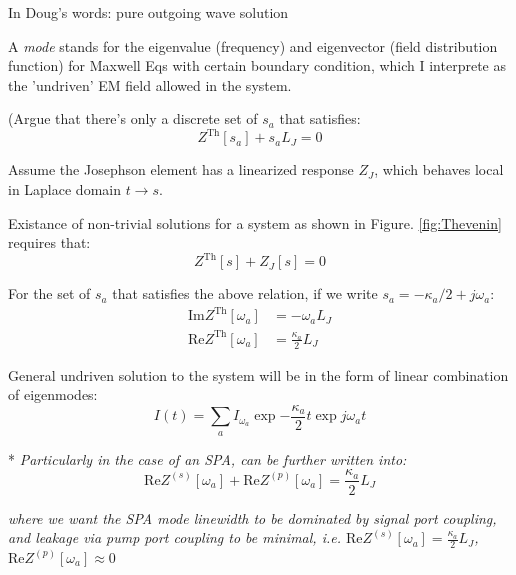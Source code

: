 \documentclass{article}
\renewcommand{\Re}{\mathrm{Re}}
\renewcommand{\Im}{\mathrm{Im}}
\newcommand{\Th}{\mathrm{Th}}
\begin{document}

In Doug's words: pure outgoing wave solution

A \emph{mode} stands for the eigenvalue (frequency) and eigenvector (field distribution function) for Maxwell Eqs with certain boundary condition, which I interprete as the 'undriven' EM field allowed in the system.

(Argue that there's only a discrete set of ${s_a}$ that satisfies: 
\[
Z^\Th[s_a] + s_a L_J = 0
\]


Assume the Josephson element has a linearized response $Z_J$, which behaves local in Laplace domain $t \rightarrow s$. 

Existance of non-trivial solutions for a system as shown in Figure. \ref{fig:Thevenin} requires that: 
\begin{equation}
	Z^\Th[s] + Z_J[s]= 0
\end{equation}

For the set of ${s_a}$ that satisfies the above relation, if we write $s_a = - \kappa_a/2 + j \omega_a$: 
\begin{align}
	\Im{Z^\Th[\omega_a]} &=  - \omega_a L_J \label{eq:R1}\\
	\Re{Z^\Th[\omega_a]} &=  \frac{\kappa_a}{2} L_J  \label{eq:R2}
\end{align}

General undriven solution to the system will be in the form of linear combination of eigenmodes: 
\begin{equation}
	I(t) = \sum_a I_{\omega_a} \exp{- \frac{\kappa_a}{2} t} \exp{j\omega_a t}
\end{equation}

*\emph{ Particularly in the case of an SPA,  can be further written into: }
\begin{equation}
\Re{Z^{(s)}[\omega_a]} + \Re{Z^{(p)}[\omega_a]} =  \frac{\kappa_a}{2} L_J
\end{equation}

\emph{where we want the SPA mode linewidth to be dominated by signal port coupling, and leakage via pump port coupling to be minimal, 
i.e. $\Re Z^{(s)}[\omega_a]= \frac{\kappa_a}{2}L_J$, $\Re Z^{(p)}[\omega_a] \approx 0$
}
\end{document}
